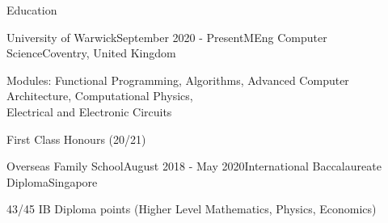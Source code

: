 \documentclass{resume}
\begin{document}
    \begin{rSection}{Education}
        \begin{rSubsection}{University of Warwick}{September 2020 - Present}{MEng Computer Science}{Coventry, United Kingdom}{}
        \item Modules: Functional Programming, Algorithms, Advanced Computer Architecture, Computational Physics, \\Electrical and Electronic Circuits
        \item First Class Honours (20/21)
        \end{rSubsection}
        \begin{rSubsection}{Overseas Family School}{August 2018 - May 2020}{International Baccalaureate Diploma}{Singapore}{}
        \item 43/45 IB Diploma points (Higher Level Mathematics, Physics, Economics)
        \end{rSubsection}
    \end{rSection}
\end{document}
